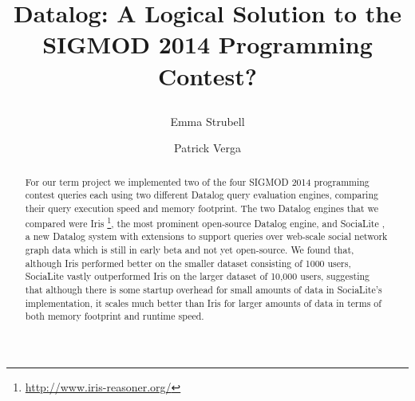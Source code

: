 \documentclass{article}
\title{
\LARGE\bf Datalog: A Logical Solution to the SIGMOD 2014 Programming Contest? \\
\date{}
\author{ Emma Strubell \and Patrick Verga}
}
\begin{document}
\maketitle

\begin{abstract}
For our term project we implemented two of the four SIGMOD 2014 programming contest queries each using two different Datalog query evaluation engines, comparing their query execution speed and memory footprint. The two Datalog engines that we compared were Iris \footnote{\protect\url{http://www.iris-reasoner.org/}}, the most prominent open-source Datalog engine, and SociaLite \cite{seo-et-al-13a}, a new Datalog system with extensions to support queries over web-scale social network graph data which is still in early beta and not yet open-source. We found that, although Iris performed better on the smaller dataset consisting of 1000 users, SociaLite vastly outperformed Iris on the larger dataset of 10,000 users, suggesting that although there is some startup overhead for small amounts of data in SociaLite's implementation, it scales much better than Iris for larger amounts of data in terms of both memory footprint and runtime speed.
\end{abstract}

\thispagestyle{fancy}
\end{document}

